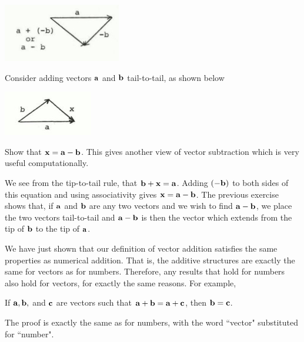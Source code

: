 \documentclass[12pt,letterpaper,reqno]{article}
\numberwithin{equation}{section}
\begin{document}
\begin{center}
	\includegraphics[scale=0.5]{figures_mvc/a_minus_b}
\end{center}

\begin{exercise}
Consider adding vectors ${\bf a}$ and ${\bf b}$ tail-to-tail, as shown below
	\begin{center}
		\includegraphics[scale=0.5]{figures_mvc/b_plus_x_equals_a}
	\end{center}
	Show that ${\bf x}={\bf a}-{\bf b}$. This gives another view of vector subtraction which is very useful computationally.
\end{exercise}

{\color{red} 
We see from the tip-to-tail rule, that ${\bf b}+{\bf x}={\bf a}$. Adding $(-{\bf b})$ to both sides of this equation and using associativity gives ${\bf x}={\bf a}-{\bf b}$.}
The previous exercise shows that, if ${\bf a}$ and ${\bf b}$ are any two vectors and we wish to find ${\bf a}-{\bf b}$, we place the two vectors tail-to-tail and ${\bf a}-{\bf b}$ is then the vector which extends from the tip of ${\bf b}$ to the tip of ${\bf a}$.

We have just shown that our definition of vector addition satisfies the same properties as numerical addition. That is, the additive structures are exactly the same for vectors as for numbers. Therefore, any results that hold for numbers also hold for vectors, for exactly the same reasons. For example,

\begin{thm}
	If ${\bf a}, {\bf b},$ and ${\bf c}$ are vectors such that ${\bf a}+{\bf b}={\bf a}+{\bf c}$, then ${\bf b}={\bf c}$. 
\end{thm}

\begin{pf}
The proof is exactly the same as for numbers, with the word ``vector" substituted for ``number".
\end{pf}
\end{document}
